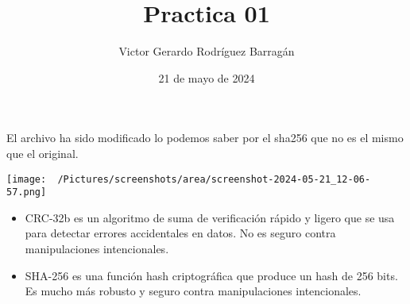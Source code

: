 \documentclass{article}
\title{Practica 01}
\author{Victor Gerardo Rodríguez Barragán}
\date{21 de mayo de 2024}
\begin{document}
\maketitle

El archivo ha sido modificado lo podemos saber
por el sha256 que no es el mismo que el original.
\begin{center}
    \texttt{[image: ~/Pictures/screenshots/area/screenshot-2024-05-21\_12-06-57.png]}
\end{center}

\begin{itemize}
    \item CRC-32b es un algoritmo de suma de verificación rápido y ligero que se usa para detectar errores accidentales en datos. No es seguro contra manipulaciones intencionales.
    \item SHA-256 es una función hash criptográfica que produce un hash de 256 bits. Es mucho más robusto y seguro contra manipulaciones intencionales.
\end{itemize}
\end{document}
